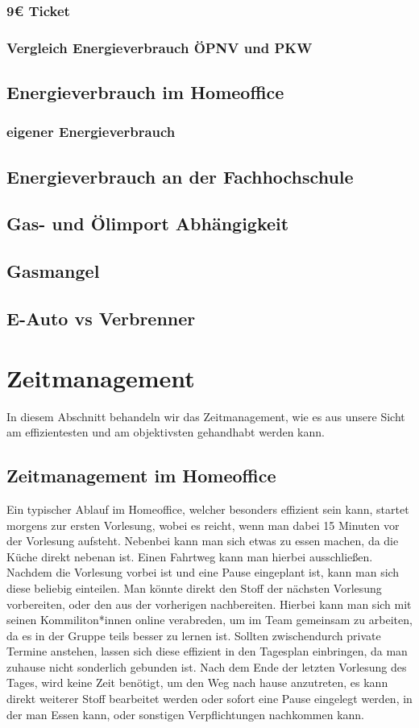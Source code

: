 \documentclass[a4paper,12pt]{scrartcl}
\begin{document}
\subsubsection{9€ Ticket}
\subsubsection{Vergleich Energieverbrauch ÖPNV und PKW}
\subsection{Energieverbrauch im Homeoffice}
\subsubsection{eigener Energieverbrauch}
\subsection{Energieverbrauch an der Fachhochschule}
\subsection{Gas- und Ölimport Abhängigkeit}
\subsection{Gasmangel}
\subsection{E-Auto vs Verbrenner}

\section{Zeitmanagement}
In diesem Abschnitt behandeln wir das Zeitmanagement, wie es aus unsere Sicht am effizientesten und am objektivsten gehandhabt werden kann.

\subsection{Zeitmanagement im Homeoffice}
Ein typischer Ablauf im Homeoffice, welcher besonders effizient sein kann, startet morgens zur ersten Vorlesung, wobei es reicht, wenn man dabei 15 Minuten vor der Vorlesung aufsteht. Nebenbei kann man sich etwas zu essen machen, da die Küche direkt nebenan ist. Einen Fahrtweg kann man hierbei ausschließen. Nachdem die Vorlesung vorbei ist und eine Pause eingeplant ist, kann man sich diese beliebig einteilen. Man könnte direkt den Stoff der nächsten Vorlesung vorbereiten, oder den aus der vorherigen nachbereiten. Hierbei kann man sich mit seinen Kommiliton*innen online verabreden, um im Team gemeinsam zu arbeiten, da es in der Gruppe teils besser zu lernen ist. Sollten zwischendurch private Termine anstehen, lassen sich diese effizient in den Tagesplan einbringen, da man zuhause nicht sonderlich gebunden ist. Nach dem Ende der letzten Vorlesung des Tages, wird keine Zeit benötigt, um den Weg nach hause anzutreten, es kann direkt weiterer Stoff bearbeitet werden oder sofort eine Pause eingelegt werden, in der man Essen kann, oder sonstigen Verpflichtungen nachkommen kann.
\end{document}
